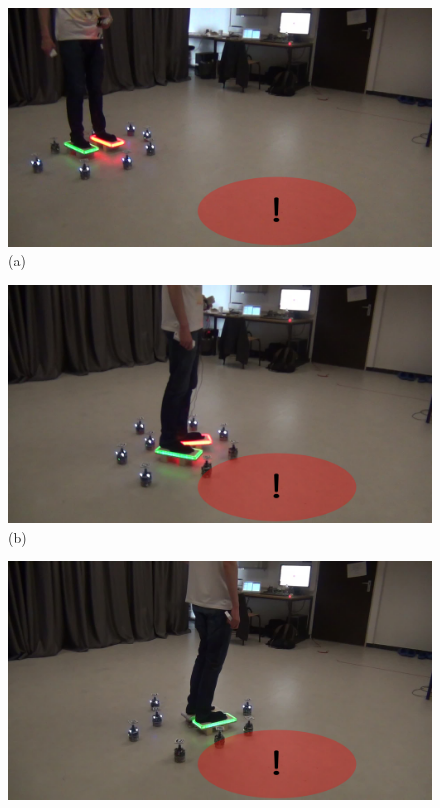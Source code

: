\documentclass[oneside, a4paper, 12pt]{memoir}
\begin{document}
			\begin{figure}[!htp]
				\begin{minipage}[c]{0.49\textwidth}
					\includegraphics[width=\textwidth]{images/vlcsnap-00001.jpg}
					\centering (a)
				\end{minipage}
				\hfill
				\begin{minipage}[c]{0.49\textwidth}
					\includegraphics[width=\textwidth]{images/vlcsnap-00002.jpg}
					\centering (b)
				\end{minipage}
				\begin{minipage}[c]{0.49\textwidth}
					\includegraphics[width=\textwidth]{images/vlcsnap-00003.jpg}

\end{minipage}
\end{figure}
\end{document}
